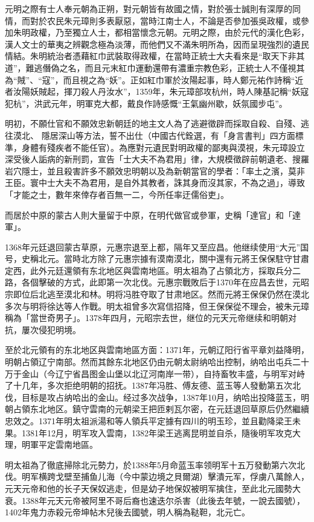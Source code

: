 元明之際有士人奉元朝為正朔，對元朝皆有故國之情，對於張士誠則有深厚的同情，而對於农民朱元璋則多表厭惡，當時江南士人，不論是否參加張吳政權，或參加朱明政權，乃至獨立人士，都相當懷念元朝。元明之際，由於元代的漢化色彩，漢人文士的華夷之辨觀念極為淡薄，而他們又不滿朱明所為，因而呈現強烈的遺民情結。朱明統治者憑藉紅巾武裝取得政權，在當時正統士大夫看來是“取天下非其道”，難逃僭偽之名，而且元末紅巾運動還帶有濃重宗教色彩，正統士人不僅視其為“賊”、“寇”，而且視之為“妖”。正如紅巾軍於汝陽起事，時人鄭元祐作詩稱“近者汝陽妖賊起，揮刀殺人丹汝水”，1359年，朱元璋部攻杭州，時人陳基記稱“妖寇犯杭”，洪武元年，明軍克大都，戴良作詩感慨“王氣幽州歇，妖氛國步屯”。

明初，不願仕官和不願效忠新朝廷的地主文人為了逃避徵辟而採取自殺、自殘、逃往漠北、 隱居深山等方法，誓不出仕（中國古代銓選，有「身言書判」四方面標準，身體有殘疾者不能任官）。為應對元遺民對明政權的鄙夷與漠視，朱元璋設立深受後人詬病的新刑罰，宣告「士大夫不為君用」律，大規模徵辟前朝遺老、搜羅岩穴隱士，並且殺害許多不願效忠明朝以及為新朝當官的學者：「率土之濱，莫非王臣。寰中士大夫不為君用，是自外其教者，誅其身而沒其家，不為之過」，導致「才能之士，數年來倖存者百無一二，今所任率迂儒俗吏」。

而居於中原的蒙古人則大量留于中原，在明代做官或參軍，史稱「達官」和「達軍」。

1368年元廷退回蒙古草原，元惠宗退至上都，隔年又至应昌。他继续使用“大元”国号，史稱北元。當時北方除了元惠宗據有漠南漠北，關中還有元將王保保駐守甘肅定西，此外元廷還領有东北地区與雲南地區。明太祖為了占領北方，採取兵分二路，各個擊破的方式，此即第一次北伐。元惠宗戰敗后于1370年在应昌去世，元昭宗即位后北逃至漠北和林。明将冯胜夺取了甘肃地区。然而元將王保保仍然在漠北多次与明将徐达等人作戰。明太祖曾多次寫信招降，但王保保從不理会，被朱元璋稱為「當世奇男子」。1378年四月，元昭宗去世，继位的元天元帝继续和明朝对抗，屢次侵犯明境。

至於北元領有的东北地区與雲南地區方面：1371年，元朝辽阳行省平章刘益降明，明朝占領辽宁南部。然而其餘东北地区仍由元朝太尉纳哈出控制，纳哈出屯兵二十万于金山（今辽宁省昌图金山堡以北辽河南岸一带），自持畜牧丰盛，与明军对峙了十几年，多次拒绝明朝的招抚。1387年冯胜、傅友德、蓝玉等人發動第五次北伐，目标是攻占纳哈出的金山。经过多次战争，1387年10月，纳哈出投降蓝玉，明朝占領东北地区。鎮守雲南的元朝梁王把匝剌瓦尔密，在元廷退回草原后仍然繼續忠效之。1371年明太祖派湯和等人領兵平定據有四川的明玉珍，並且勸降梁王未果。1381年12月，明军攻入雲南，1382年梁王逃离昆明並自杀，隨後明军攻克大理，明軍平定雲南地區。

明太祖為了徹底掃除北元勢力，於1388年5月命蓝玉率领明军十五万發動第六次北伐。明军横跨戈壁至捕鱼儿海（今中蒙边境之貝爾湖）擊潰元军，俘虜八萬餘人，元天元帝和他的长子天保奴逃走，但是幼子地保奴被明军擒住，至此北元國勢大衰。1388年元天元帝被阿里不哥后裔也速迭尔杀害（此後去年號，一說去國號），1402年鬼力赤殺元帝坤帖木兒後去國號，明人稱為鞑靼，北元亡。

